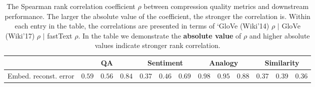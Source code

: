 \begin{table}
	\caption{The Spearman rank correlation coefficient $\rho$ between compression quality metrics and downstream performance. The larger the absolute value of the coefficient, the stronger the correlation is.
	Within each entry in the table, the correlations are presented in terms of `GloVe (Wiki'14) $\rho$ \; $|$ \; GloVe (Wiki'17) $\rho$ \; $|$ \; fastText $\rho$. In the table we demonstrate the \textbf{absolute value} of $\rho$ and higher absolute values indicate stronger rank correlation.
	}
	\small
	\centering
	\begin{tabular}{c | c | c | c | c | c | c | c | c | c | c | c | c}
		\toprule
		& \multicolumn{3}{|c|}{QA} & \multicolumn{3}{|c|}{Sentiment} & \multicolumn{3}{|c|}{Analogy} & \multicolumn{3}{|c}{Similarity} \\
		\midrule
		Embed. reconst. error &  $0.59$&$0.56$&$0.84$  &  $0.37$&$0.46$&$0.69$  &  $\mathbf{0.98}$&$\mathbf{0.95}$&$\mathbf{0.88}$  &  $0.37$&$0.39$&$0.36$  \\ 

\end{tabular}
\end{table}
